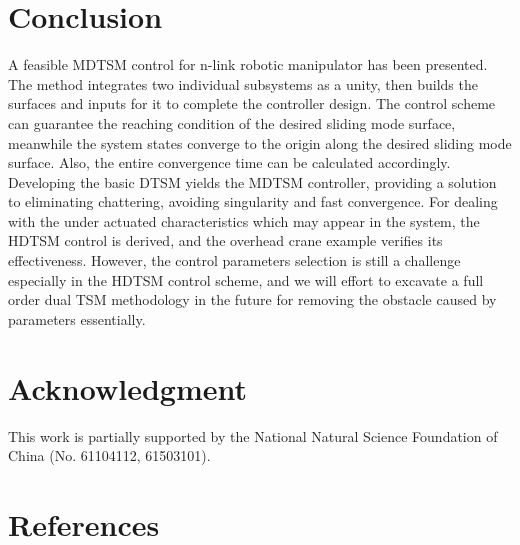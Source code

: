 \documentclass[3p]{elsarticle}
\theoremstyle{plain}
\theoremstyle{remark}
\begin{document}
\section{Conclusion}\label{sec:5}
A feasible MDTSM control for n-link robotic manipulator has been presented. The method integrates two individual subsystems as a unity, then builds the surfaces and inputs for it to complete the controller design. The control scheme can guarantee the reaching condition of the desired sliding mode  surface, meanwhile the system states converge to the origin along the desired sliding mode  surface. Also, the entire convergence time can be calculated accordingly. Developing the basic DTSM yields the MDTSM controller, providing a solution to eliminating chattering, avoiding singularity and fast convergence. For dealing with the under actuated characteristics which may appear in the system, the HDTSM control is derived, and the overhead crane example verifies its effectiveness. However, the control parameters selection is still a challenge especially in the HDTSM control scheme, and we will effort to excavate a full order dual TSM methodology in the future for removing the obstacle caused by parameters essentially.
\section{Acknowledgment}
This work is partially supported by the National Natural Science Foundation of China (No. 61104112, 61503101).
\section{References}


\end{document}
